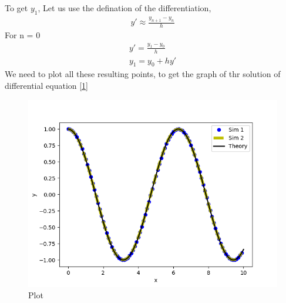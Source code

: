 \documentclass[journal]{IEEEtran}
\begin{document}
To get $y_1$, Let us use the defination of the differentiation,
\begin{align}
y' \approx \frac{y_{n+1} - y_n}{h}
\end{align}
For n = 0 \\
\begin{align}
y' = \frac{y_1 - y_0}{h} \\
y_1 = y_0 + hy'
\end{align}
We need to plot all these resulting points, to get the graph of thr solution of differential equation \eqref{1} 


\begin{figure}[htbp] %
    \centering
    \includegraphics[width=\textwidth]{figs/plot.png} %
    \caption{Plot}
\end{figure}
\end{document}
